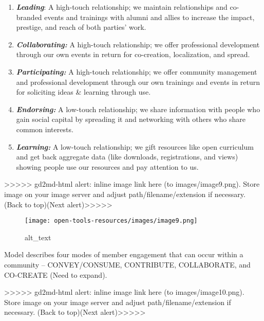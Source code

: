 \documentclass[
  letterpaper,
  DIV=11,
  numbers=noendperiod]{scrreport}
\providecommand{\tightlist}{%
  \setlength{\itemsep}{0pt}\setlength{\parskip}{0pt}}\usepackage{longtable,booktabs,array}
\begin{document}
\begin{enumerate}
\def\labelenumi{\arabic{enumi}.}
\tightlist
\item
  \textbf{\emph{Leading}}: A high-touch relationship; we maintain
  relationships and co-branded events and trainings with alumni and
  allies to increase the impact, prestige, and reach of both parties'
  work.
\item
  \textbf{\emph{Collaborating:}} A high-touch relationship; we offer
  professional development through our own events in return for
  co-creation, localization, and spread.
\item
  \textbf{\emph{Participating:}} A high-touch relationship; we offer
  community management and professional development through our own
  trainings and events in return for soliciting ideas \& learning
  through use.
\item
  \textbf{\emph{Endorsing:}} A low-touch relationship; we share
  information with people who gain social capital by spreading it and
  networking with others who share common interests.
\item
  \textbf{\emph{Learning:}} A low-touch relationship; we gift resources
  like open curriculum and get back aggregate data (like downloads,
  registrations, and views) showing people use our resources and pay
  attention to us.
\end{enumerate}

{\textgreater\textgreater\textgreater\textgreater\textgreater{}
gd2md-html alert: inline image link here (to images/image9.png). Store
image on your image server and adjust path/filename/extension if
necessary. }(Back to top)(Next
alert){\textgreater\textgreater\textgreater\textgreater\textgreater{} }

\begin{figure}

{\centering \texttt{[image: open-tools-resources/images/image9.png]}

}

\caption{alt\_text}

\end{figure}

Model describes four modes of member engagement that can occur within a
community -- CONVEY/CONSUME, CONTRIBUTE, COLLABORATE, and CO-CREATE
(Need to expand).

{\textgreater\textgreater\textgreater\textgreater\textgreater{}
gd2md-html alert: inline image link here (to images/image10.png). Store
image on your image server and adjust path/filename/extension if
necessary. }(Back to top)(Next
alert){\textgreater\textgreater\textgreater\textgreater\textgreater{} }
\end{document}
